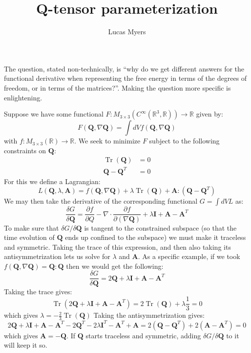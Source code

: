 \documentclass[reqno]{article}
\newcommand{\Q}{\mathbf{Q}}
\newcommand{\A}{\mathbf{A}}
\newcommand{\I}{\mathbf{I}}
\DeclareMathOperator{\Tr}{Tr}
\begin{document}
\title{Q-tensor parameterization}
\author{Lucas Myers}
\maketitle

The question, stated non-technically, is ``why do we get different answers for the functional derivative when representing the free energy in terms of the degrees of freedom, or in terms of the matrices?''.
Making the question more specific is enlightening.

Suppose we have some functional $F: M_{3 \times 3} \left( C^{\infty} \left( \mathbb{R}^3, \mathbb{R} \right) \right) \to \mathbb{R}$ given by:
\begin{equation}
    F\left( \Q, \nabla \Q \right)
    =
    \int dV f \left(\Q, \nabla \Q\right)
\end{equation}
with $f: M_{3 \times 3} \left( \mathbb{R} \right) \to \mathbb{R}$.
We seek to minimize $F$ subject to the following constraints on $\Q$:
\begin{align}
    \Tr(\Q) &= 0 \\
    \Q - \Q^T &= 0
\end{align}
For this we define a Lagrangian:
\begin{equation}
    L(\Q, \lambda, \A)
    =
    f(\Q, \nabla \Q)
    + \lambda \Tr(\Q)
    + \A : \left( \Q - \Q^T \right)
\end{equation}
We may then take the derivative of the corresponding functional $G = \int dV L$ as:
\begin{equation}
    \frac{\delta G}{\delta \Q}
    =
    \frac{\partial f}{\partial Q}
    - \nabla \cdot \frac{\partial f}{\partial \left( \nabla \Q \right)}
    + \lambda \I
    + \A - \A^T
\end{equation}
To make sure that $\delta G / \delta \Q$ is tangent to the constrained subspace (so that the time evolution of $\Q$ ends up confined to the subspace) we must make it traceless and symmetric.
Taking the trace of this expression, and then also taking its antisymmetrization lets us solve for $\lambda$ and $\A$.
As a specific example, if we took $f(\Q, \nabla \Q) = \Q : \Q$ then we would get the following:
\begin{equation}
    \frac{\delta G}{\delta \Q}
    =
    2 \Q
    + \lambda \I
    + \A - \A^T
\end{equation}
Taking the trace gives:
\begin{equation}
    \Tr\left(
        2 \Q
        + \lambda \I
        + \A - \A^T
    \right)
    =
    2 \Tr \left( \Q \right)
    + \lambda \frac13
    =
    0
\end{equation}
which gives $\lambda = -\tfrac23 \Tr\left(\Q\right)$
Taking the antisymmetrization gives:
\begin{equation}
    2 \Q
    + \lambda \I
    + \A - \A^T
    - 2 \Q^T
    - 2 \lambda \I^T
    - \A^T + \A
    =
    2 \left( \Q - \Q^T \right)
    + 2 \left( \A - \A^T \right)
    =
    0
\end{equation}
which gives $\A = -\Q$.
If $\Q$ starts traceless and symmetric, adding $\delta G / \delta \Q$ to it will keep it so.
\end{document}
